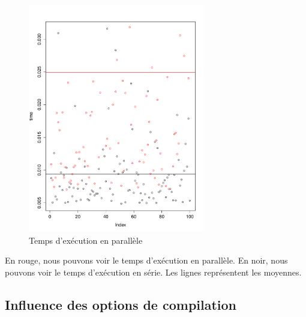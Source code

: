 \begin{figure}[H]
	\begin{center}
		\includegraphics[height=10cm]{diagrams/time_serial_paral.pdf}
		\caption{Temps d'exécution en parallèle}
		\label{fig:timeSerialParal}
	\end{center}
\end{figure}
En rouge, nous pouvons voir le temps d'exécution en parallèle.
En noir, nous pouvons voir le temps d'exécution en série.
Les lignes représentent les moyennes.


\subsection{Influence des options de compilation}



